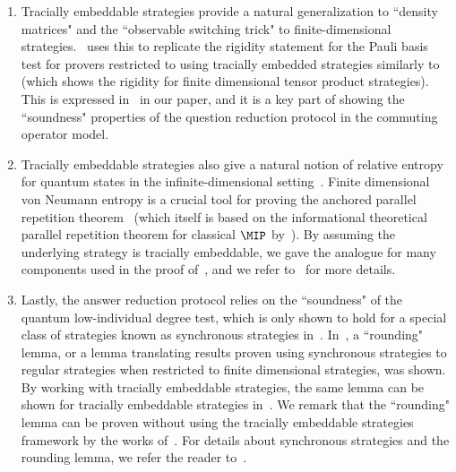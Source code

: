 \begin{enumerate}
	\item Tracially embeddable strategies provide a natural generalization to ``density matrices" and the ``observable switching trick" to finite-dimensional strategies.~\cite{linTracialEmbeddableStrategies2024} uses this to replicate the rigidity statement for the Pauli basis test for provers restricted to using tracially embedded strategies similarly to~\cite[Theorem 7.14]{jiMIPRE2022a} (which shows the rigidity for finite dimensional tensor product strategies). This is expressed in~ in our paper, and it is a key part of showing the ``soundness" properties of the question reduction protocol in the commuting operator model. 
	\item Tracially embeddable strategies also give a natural notion of relative entropy for quantum states in the infinite-dimensional setting~\cite{arakiRelativeEntropyStates1977}. Finite dimensional von Neumann entropy is a crucial tool for proving the anchored parallel repetition theorem~\cite{bavarianAnchoredParallelRepetition2021} (which itself is based on the informational theoretical parallel repetition theorem for classical $\MIP$ by~\cite{razParallelRepetitionTheorem1995a}). By assuming the underlying strategy is tracially embeddable, we gave the analogue for many components used in the proof of~\cite{bavarianAnchoredParallelRepetition2021}, and we refer to~ for more details. 
	\item Lastly, the answer reduction protocol relies on the ``soundness" of the quantum low-individual degree test, which is only shown to hold for a special class of strategies known as synchronous strategies in~\cite{jiQuantumSoundnessTesting2022}. In~\cite{vidickAlmostSynchronousQuantum2022}, a ``rounding" lemma, or a lemma translating results proven using synchronous strategies to regular strategies when restricted to finite dimensional strategies, was shown. By working with tracially embeddable strategies, the same lemma can be shown for tracially embeddable strategies in~\cite{linTracialEmbeddableStrategies2024}. We remark that the ``rounding" lemma can be proven without using the tracially embeddable strategies framework by the works of~\cite{delasalleAlmostSynchronousCorrelations2023}. For details about synchronous strategies and the rounding lemma, we refer the reader to~.
\end{enumerate}

